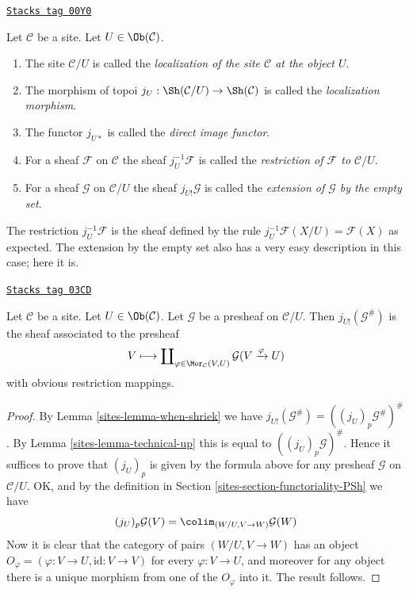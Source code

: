 \begin{definition}[Localize]
\label{sites-definition-localize}
\href{https://stacks.math.columbia.edu/tag/00Y0}{\texttt{Stacks tag 00Y0}}

Let $\mathcal{C}$ be a site.
Let $U \in \Ob(\mathcal{C})$.
\begin{enumerate}
\item The site $\mathcal{C}/U$ is called the {\it localization of
the site $\mathcal{C}$ at the object $U$}.
\item The morphism of topoi
$j_U : \Sh(\mathcal{C}/U) \to \Sh(\mathcal{C})$
is called the {\it localization morphism}.
\item The functor $j_{U*}$ is called the {\it direct image functor}.
\item For a sheaf $\mathcal{F}$ on $\mathcal{C}$ the sheaf
$j_U^{-1}\mathcal{F}$ is called the {\it restriction of $\mathcal{F}$
to $\mathcal{C}/U$}.
\item For a sheaf $\mathcal{G}$ on $\mathcal{C}/U$
the sheaf $j_{U!}\mathcal{G}$ is called the
{\it extension of $\mathcal{G}$ by the empty set}.
\end{enumerate}
\end{definition}

The restriction $j_U^{-1}\mathcal{F}$ is the sheaf
defined by the rule $j_U^{-1}\mathcal{F}(X/U) = \mathcal{F}(X)$ as expected.
The extension by the empty set also has a very easy description in
this case; here it is.

\begin{lemma}
\label{sites-lemma-describe-j-shriek}
\href{https://stacks.math.columbia.edu/tag/03CD}{\texttt{Stacks tag 03CD}}

Let $\mathcal{C}$ be a site.
Let $U \in \Ob(\mathcal{C})$.
Let $\mathcal{G}$ be a presheaf on $\mathcal{C}/U$.
Then $j_{U!}(\mathcal{G}^\#)$ is the sheaf associated to the presheaf
$$
V
\longmapsto
\coprod\nolimits_{\varphi \in \Mor_\mathcal{C}(V, U)}
\mathcal{G}(V \xrightarrow{\varphi} U)
$$
with obvious restriction mappings.
\end{lemma}

\begin{proof}

By Lemma \ref{sites-lemma-when-shriek} we have
$j_{U!}(\mathcal{G}^\#) = ((j_U)_p\mathcal{G}^\#)^\#$.
By Lemma \ref{sites-lemma-technical-up} this is equal to $((j_U)_p\mathcal{G})^\#$.
Hence it suffices to prove that $(j_U)_p$ is given by
the formula above for any presheaf $\mathcal{G}$ on $\mathcal{C}/U$.
OK, and by the definition in Section \ref{sites-section-functoriality-PSh} we have
$$
(j_U)_p\mathcal{G}(V)
=
\colim_{(W/U, V \to W)} \mathcal{G}(W)
$$
Now it is clear that the category of pairs $(W/U, V \to W)$
has an object $O_\varphi = (\varphi : V \to U, \text{id} : V \to V)$ for every
$\varphi : V \to U$, and moreover for any object there is a unique
morphism from one of the $O_\varphi$ into it. The result follows.
\end{proof}

